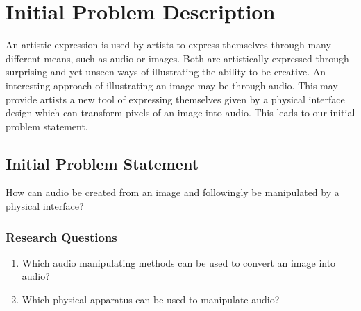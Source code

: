 \chapter{Initial Problem Description}\label{ch:initproblem}
An artistic expression is used by artists to express themselves through many different means, such as audio or images. Both are artistically expressed through surprising and yet unseen ways of illustrating the ability to be creative. An interesting approach of  illustrating an image may be through audio. This may provide artists a new tool of expressing themselves given by a physical interface design which can transform pixels of an image into audio. This leads to our initial problem statement.

\section{Initial Problem Statement}\label{inistatement}

How can audio be created from an image and followingly be manipulated by a physical interface? 

\subsection{Research Questions}\label{resquestions}

\begin{enumerate}
\item Which audio manipulating methods can be used to convert an image into audio?
\item Which physical apparatus can be used to manipulate audio?

\end{enumerate}
